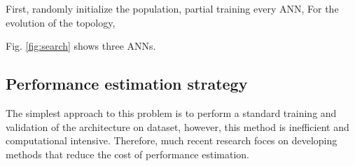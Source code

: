 First,  randomly initialize the population, partial training every ANN, 
For the evolution of the topology,

Fig. \ref{fig:search} shows three ANNs.


\subsection{Performance estimation strategy}
The simplest approach to this problem is to perform a standard training and
validation of the architecture on dataset, however, this method is inefficient
and computational intensive. Therefore, much recent
research\cite{baker2017accelerating} foces on developing methods that reduce
the cost of performance estimation.





